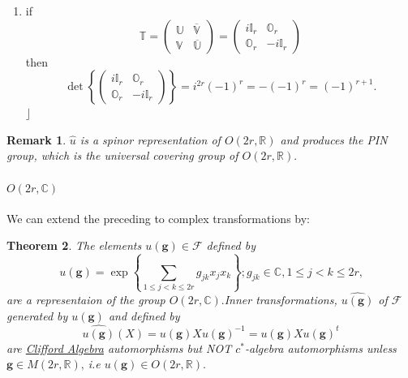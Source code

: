 \documentclass[aps, preprint]{revtex4}
\newtheorem{theorem}{Theorem}
\newtheorem{remark}[theorem]{Remark}
\begin{document}
\begin{enumerate}
\item if
\begin{equation}\mathbb{T} =\left (\begin{array}{cc}\mathbb{U} & \overline{\mathbb{V}} \\
\mathbb{V} & \overline{\mathbb{U}}\end{array}\right ) =\left (\begin{array}{cc}i \mathbb{I}_{r} & \mathbb{O}_{r} \\
\mathbb{O}_{r} &  -i \mathbb{I}_{r}\end{array}\right )
\end{equation}then
\begin{equation}\det \left \{\left (\begin{array}{cc}i \mathbb{I}_{r} & \mathbb{O}_{r} \\
\mathbb{O}_{r} &  -i \mathbb{I}_{r}\end{array}\right )\right \} =i^{2 r} \left ( -1\right )^{r} = -\left ( -1\right )^{r} =\left ( -1\right )^{r +1}\text{.}
\end{equation}$\rfloor $ \end{enumerate}



\begin{remark}
$\widehat{u}$ is a spinor representation of $O \left (2 r ,\mathbb{R}\right )$ and produces the \emph{PIN} group, which is the universal covering group of $O \left (2 r ,\mathbb{R}\right )\text{.}$ 
\end{remark}

\paragraph{$O \left (2 r ,\mathbb{C}\right )$}
We can extend the preceding to complex transformations by: 


\begin{theorem}
The elements $u \left (\mathbf{g}\right ) \in \mathcal{F}$ defined by
\begin{equation}u \left (\mathbf{g}\right ) =\exp  \left \{ \sum _{1 \leq j <k \leq 2 r}g_{j k} x_{j} x_{k}\right \} ;g_{j k} \in \mathbb{C} ,1 \leq j <k \leq 2 r\text{,}
\end{equation}are a representaion of the group $O \left (2 r ,\mathbb{C}\right )\text{.}$Inner transformations, $\widehat{u \left (\mathbf{g}\right )}$ of $\mathcal{F}$ generated by $u \left (\mathbf{g}\right )$ and defined by
\begin{equation}\widehat{u \left (\mathbf{g}\right )} \left (X\right ) =u \left (\mathbf{g}\right ) X u \left (\mathbf{g}\right )^{ -1} =u \left (\mathbf{g}\right ) X u \left (\mathbf{g}\right )^{t}
\end{equation}are \underline {\emph{Clifford Algebra}} automorphisms \emph{but NOT} $c^{ \ast }$\emph{-algebra} automorphisms unless $\mathbf{g} \in M \left (2 r ,\mathbb{R}\right )\text{,}$ i.e $u \left (\mathbf{g}\right ) \in O \left (2 r ,\mathbb{R}\right )\text{.}$ 
\end{theorem}
\end{document}
